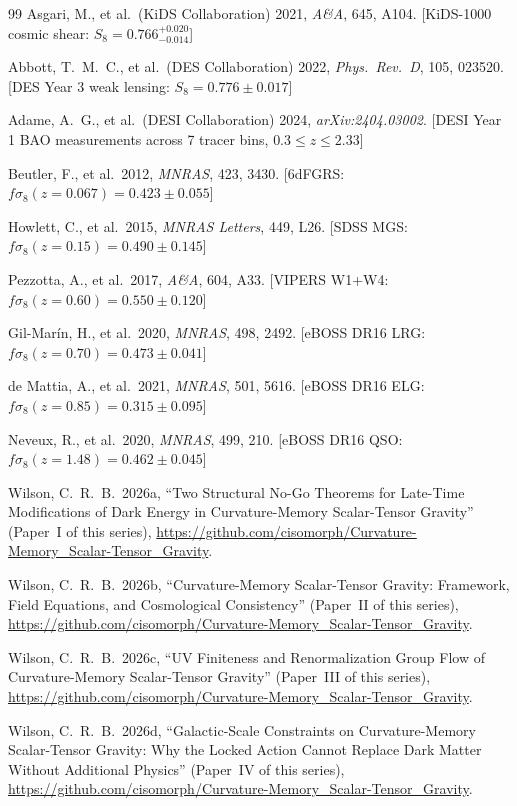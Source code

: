 \documentclass[12pt,a4paper]{article}
\begin{document}
\begin{thebibliography}{99}
Asgari, M., et al.\ (KiDS Collaboration) 2021,
\textit{A\&A}, 645, A104.
[KiDS-1000 cosmic shear: $S_8 = 0.766^{+0.020}_{-0.014}$]

Abbott, T.~M.~C., et al.\ (DES Collaboration) 2022,
\textit{Phys.\ Rev.\ D}, 105, 023520.
[DES Year 3 weak lensing: $S_8 = 0.776 \pm 0.017$]

Adame, A.~G., et al.\ (DESI Collaboration) 2024,
\textit{arXiv:2404.03002}.
[DESI Year 1 BAO measurements across 7 tracer bins, $0.3\leq z\leq 2.33$]

Beutler, F., et al.\ 2012, \textit{MNRAS}, 423, 3430.
[6dFGRS: $f\sigma_8(z=0.067)=0.423\pm0.055$]

Howlett, C., et al.\ 2015, \textit{MNRAS Letters}, 449, L26.
[SDSS MGS: $f\sigma_8(z=0.15)=0.490\pm0.145$]

Pezzotta, A., et al.\ 2017, \textit{A\&A}, 604, A33.
[VIPERS W1+W4: $f\sigma_8(z=0.60)=0.550\pm0.120$]

Gil-Mar\'in, H., et al.\ 2020, \textit{MNRAS}, 498, 2492.
[eBOSS DR16 LRG: $f\sigma_8(z=0.70)=0.473\pm0.041$]

de Mattia, A., et al.\ 2021, \textit{MNRAS}, 501, 5616.
[eBOSS DR16 ELG: $f\sigma_8(z=0.85)=0.315\pm0.095$]

Neveux, R., et al.\ 2020, \textit{MNRAS}, 499, 210.
[eBOSS DR16 QSO: $f\sigma_8(z=1.48)=0.462\pm0.045$]

Wilson, C.~R.~B.\ 2026a,
``Two Structural No-Go Theorems for Late-Time Modifications of Dark Energy
  in Curvature-Memory Scalar-Tensor Gravity''
(Paper~I of this series),
\url{https://github.com/cisomorph/Curvature-Memory_Scalar-Tensor_Gravity}.

Wilson, C.~R.~B.\ 2026b,
``Curvature-Memory Scalar-Tensor Gravity: Framework, Field Equations,
  and Cosmological Consistency''
(Paper~II of this series),
\url{https://github.com/cisomorph/Curvature-Memory_Scalar-Tensor_Gravity}.

Wilson, C.~R.~B.\ 2026c,
``UV Finiteness and Renormalization Group Flow of Curvature-Memory
  Scalar-Tensor Gravity''
(Paper~III of this series),
\url{https://github.com/cisomorph/Curvature-Memory_Scalar-Tensor_Gravity}.

Wilson, C.~R.~B.\ 2026d,
``Galactic-Scale Constraints on Curvature-Memory Scalar-Tensor Gravity:
  Why the Locked Action Cannot Replace Dark Matter Without Additional Physics''
(Paper~IV of this series),
\url{https://github.com/cisomorph/Curvature-Memory_Scalar-Tensor_Gravity}.

\end{thebibliography}
\end{document}
